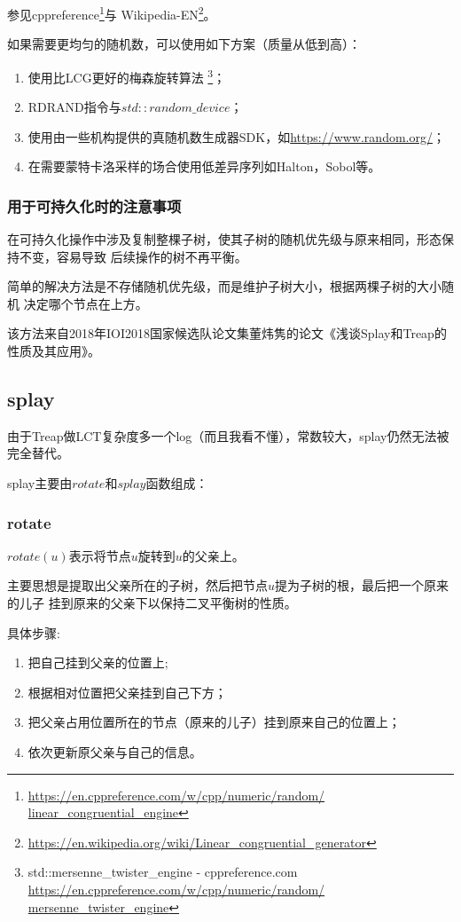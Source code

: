 参见cppreference\footnote{
	\url{https://en.cppreference.com/w/cpp/numeric/random/
		linear\_congruential\_engine}}与
Wikipedia-EN\footnote{
	\url{https://en.wikipedia.org/wiki/Linear\_congruential\_generator}}。

如果需要更均匀的随机数，可以使用如下方案（质量从低到高）：
\begin{enumerate}
	\item 使用比LCG更好的梅森旋转算法
	      \footnote{std::mersenne\_twister\_engine - cppreference.com
		      \url{https://en.cppreference.com/w/cpp/numeric/random/
			      mersenne\_twister\_engine}}；
	\item RDRAND指令与$std::random\_device$；
	\item 使用由一些机构提供的真随机数生成器SDK，如\url{https://www.random.org/}；
	\item 在需要蒙特卡洛采样的场合使用低差异序列如Halton，Sobol等。
\end{enumerate}

\subsubsection{用于可持久化时的注意事项}
在可持久化操作中涉及复制整棵子树，使其子树的随机优先级与原来相同，形态保持不变，容易导致
后续操作的树不再平衡。

简单的解决方法是不存储随机优先级，而是维护子树大小，根据两棵子树的大小随机
决定哪个节点在上方。

该方法来自2018年IOI2018国家候选队论文集董炜隽的论文《浅谈Splay和Treap的性质及其应用》。
\subsection{splay}\label{splay}

由于Treap做LCT复杂度多一个log（而且我看不懂），常数较大，splay仍然无法被完全替代。

splay主要由$rotate$和$splay$函数组成：

\subsubsection{rotate}

$rotate(u)$表示将节点$u$旋转到$u$的父亲上。

主要思想是提取出父亲所在的子树，然后把节点$u$提为子树的根，最后把一个原来的儿子
挂到原来的父亲下以保持二叉平衡树的性质。

具体步骤:
\begin{enumerate}
	\item 把自己挂到父亲的位置上;
	\item 根据相对位置把父亲挂到自己下方；
	\item 把父亲占用位置所在的节点（原来的儿子）挂到原来自己的位置上；
	\item 依次更新原父亲与自己的信息。
\end{enumerate}

